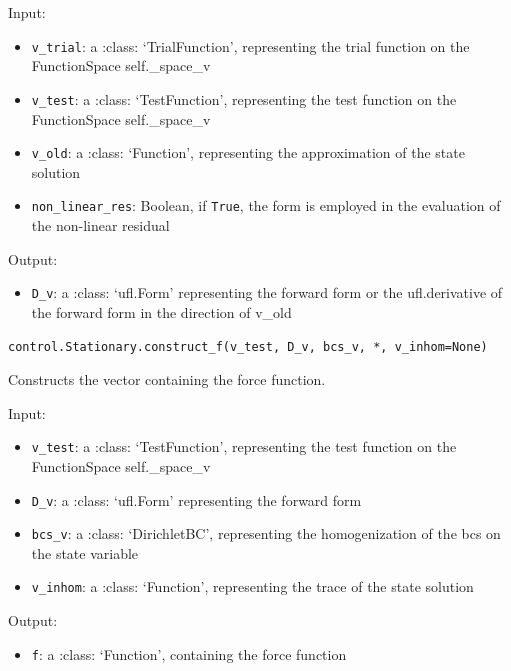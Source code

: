 \documentclass[letterpaper,10pt,english]{sphinxmanual}
\begin{document}
Input:
\begin{itemize}
\item \texttt{v{\_}trial}: a :class: `TrialFunction', representing the trial
            function on the FunctionSpace self.\_space\_v

\item \texttt{v{\_}test}: a :class: `TestFunction', representing the test
            function on the FunctionSpace self.\_space\_v

\item \texttt{v{\_}old}: a :class: `Function', representing the approximation
            of the state solution

\item \texttt{non{\_}linear{\_}res}: Boolean, if \texttt{True}, the form is employed in the
            evaluation of the non-linear residual
\end{itemize}

Output:
\begin{itemize}
\item \texttt{D{\_}v}: a :class: `ufl.Form' representing the forward form or the
            ufl.derivative of the forward form in the direction of v\_old
\end{itemize}

\vspace{3ex}

\texttt{control.Stationary.construct{\_}f(v{\_}test, D{\_}v, bcs{\_}v, *, v{\_}inhom=None)}

Constructs the vector containing the force function.

Input:
\begin{itemize}
\item \texttt{v{\_}test}: a :class: `TestFunction', representing the test
            function on the FunctionSpace self.\_space\_v

\item \texttt{D{\_}v}: a :class: `ufl.Form' representing the forward form

\item \texttt{bcs{\_}v}: a :class: `DirichletBC', representing the homogenization
            of the bcs on the state variable

\item \texttt{v{\_}inhom}: a :class: `Function', representing the trace of the
            state solution

\end{itemize}

Output:
\begin{itemize}
\item \texttt{f}: a :class: `Function', containing the force function
\end{itemize}
\end{document}
